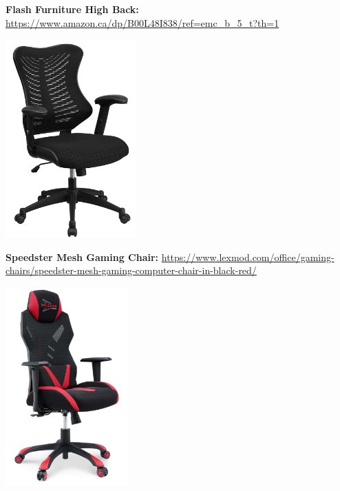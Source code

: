 \documentclass[11pt]{article}
\begin{document}
    
    \textbf{Flash Furniture High Back:} \url{https://www.amazon.ca/dp/B00L48I838/ref=emc_b_5_t?th=1}
    \begin{center}
    \includegraphics[height = 3in]{FlashFurniture.PNG}
    \end{center}

    \newpage
    \textbf{Speedster Mesh Gaming Chair:} \url{https://www.lexmod.com/office/gaming-chairs/speedster-mesh-gaming-computer-chair-in-black-red/}
    \begin{center}
    \includegraphics[height = 3in]{Speedster.PNG}
    \end{center}

    
       
\end{document}
